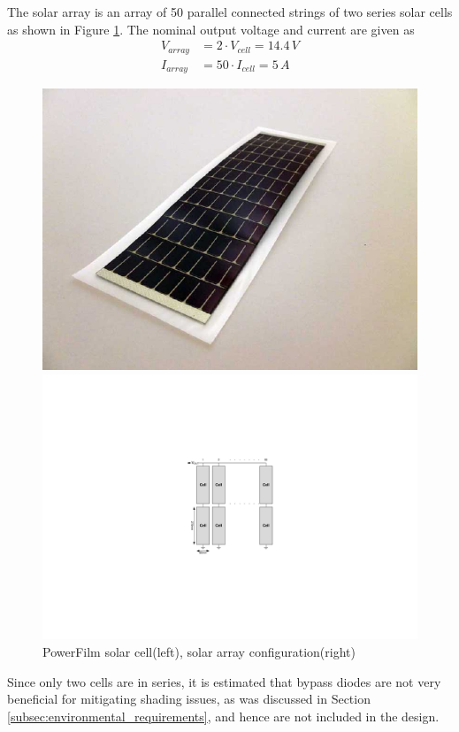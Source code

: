 %
The solar array is an array of 50 parallel connected strings of two series solar cells as shown in Figure \ref{fig:solar_cell}. The nominal output voltage and current are given as
%
\begin{equation}
\begin{split}
V_{array}&=2\cdot V_{cell}=14.4\,V\\
I_{array}&=50\cdot I_{cell}=5\,A
\end{split}
\end{equation}
%
\begin{figure}[H]
\centering
\begin{minipage}[t]{0.4\linewidth}
\centering
\includegraphics[width=1\textwidth]{figures/SolarCell_RC7-2_Powerfilm}
\end{minipage}
\hspace{5mm}
\begin{minipage}[t]{0.55\linewidth}
\centering
\includegraphics[width=\textwidth]{figures/fig_CDR_Solar_Array}
\end{minipage}
\caption{PowerFilm solar cell(left), solar array configuration(right)}
\label{fig:solar_cell}
\end{figure}
%
Since only two cells are in series, it is estimated that bypass diodes are not very beneficial for mitigating shading issues, as was discussed in Section \ref{subsec:environmental_requirements}, and hence are not included in the design.
%
